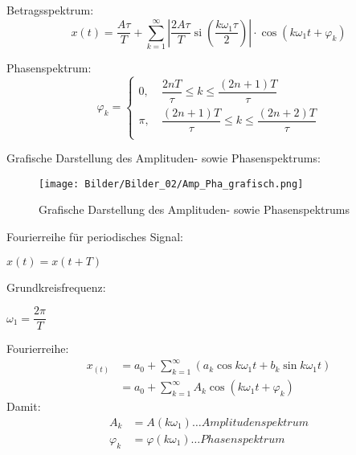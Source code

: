 Betragsspektrum:\\
\begin{equation}
    x(t)=\frac{A \tau}{T}+\sum_{k=1}^{\infty}\left|\frac{2 A \tau}{T} \operatorname{si}\left(\frac{k \omega_{1} \tau}{2}\right)\right| \cdot \cos \left(k \omega_{1} t+\varphi_{k}\right)
\end{equation}

Phasenspektrum:\\
\begin{equation}
    \varphi_k=\left\{
    \begin{array}{cl}
    0, &  \ \dfrac{2nT}{\tau}\leqslant k \leqslant \dfrac{(2n+1)T}{\tau} \\
    \pi,  &  \ \dfrac{(2n+1)T}{\tau} \leqslant k \leqslant \dfrac{(2n+2)T}{\tau} \\
    \end{array} \right.
\end{equation}

Grafische Darstellung des Amplituden- sowie Phasenspektrums:\\
\begin{figure}[H]
    \centering
    \texttt{[image: Bilder/Bilder\_02/Amp\_Pha\_grafisch.png]}
    \caption{Grafische Darstellung des Amplituden- sowie Phasenspektrums}
    \label{fig:amp_pha_grafisch}
\end{figure}

Fourierreihe für periodisches Signal:
\begin{center}
    $x(t)=x(t+T)$\\
\end{center}

Grundkreisfrequenz:
\begin{center}
    $\omega_1=\dfrac{2\pi}{T}$\\
\end{center}

Fourierreihe:
    \begin{equation}
        \begin{aligned}
        x_{(t)} &=a_{0}+\sum_{k=1}^{\infty}\left(a_{k} \cos k \omega_{1} t+b_{k} \sin k \omega_{1} t\right) \\
        &=a_{0}+\sum_{k=1}^{\infty} A_{k} \cos \left(k \omega_{1} t+\varphi_{k}\right)
        \end{aligned}
\end{equation}
Damit:
\begin{equation}
    \begin{aligned}
        A_k&=A(k\omega_1)\ldots Amplitudenspektrum\\
        \varphi_{k}&=\varphi(k\omega_1)\ldots Phasenspektrum
    \end{aligned}
\end{equation}
    

